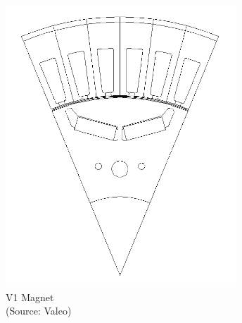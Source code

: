 \documentclass{report} %
\begin{document}
\begin{figure}[H]
    \centering
    \begin{minipage}[b]{0.325\textwidth}
        \centering
        \includegraphics[width=\textwidth]{./ReportImages/1V_Magnet.png}
        \caption{\centering V1 Magnet \\ (Source: Valeo)} %
        \label{fig:V1 Magnet}
    \end{minipage}
    \hfill
    \begin{minipage}[b]{0.325\textwidth}
        \centering

\end{minipage}
\end{figure}
\end{document}
